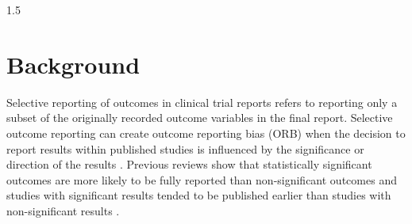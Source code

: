 \documentclass{article}
\begin{document}
\begin{spacing}{1.5}
\newpage

\section{Background} \label{Introduction}
Selective reporting of outcomes in clinical trial reports refers to reporting only a subset of the originally recorded outcome variables in the final report. Selective outcome reporting can create outcome reporting bias (ORB) when the decision to report results within published studies is influenced by the significance or direction of the results \cite{chan2005identifying, lemmens2024outcome}. Previous reviews show that statistically significant outcomes are more likely to be fully reported than non-significant outcomes \cite{chan2005identifying, chan2014increasing, jones2015comparison, glasziou2014reducing, dwan2013systematic} and studies with significant results tended to be published earlier than studies with non-significant results \cite{song2010dissemination, williamson2005outcome}.


\end{spacing}
\end{document}

